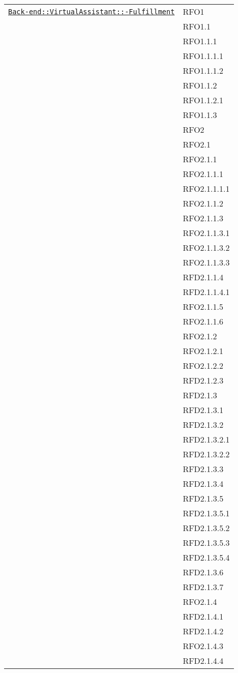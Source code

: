 \begin{longtable}{|>{\centering}m{10cm}|m{3cm}<{\centering}|}
\hyperref[Back-end::VirtualAssistant::Fulfillment]{\texttt{Back-end::VirtualAssistant::-\linebreak Fulfillment}} & RFO1\\
& RFO1.1\\
& RFO1.1.1\\
& RFO1.1.1.1\\
& RFO1.1.1.2\\
& RFO1.1.2\\
& RFO1.1.2.1\\
& RFO1.1.3\\
& RFO2\\
& RFO2.1\\
& RFO2.1.1\\
& RFO2.1.1.1\\
& RFO2.1.1.1.1\\
& RFO2.1.1.2\\
& RFO2.1.1.3\\
& RFO2.1.1.3.1\\
& RFO2.1.1.3.2\\
& RFO2.1.1.3.3\\
& RFD2.1.1.4\\
& RFD2.1.1.4.1\\
& RFO2.1.1.5\\
& RFO2.1.1.6\\
& RFO2.1.2\\
& RFO2.1.2.1\\
& RFO2.1.2.2\\
& RFD2.1.2.3\\
& RFD2.1.3\\
& RFD2.1.3.1\\
& RFD2.1.3.2\\
& RFD2.1.3.2.1\\
& RFD2.1.3.2.2\\
& RFD2.1.3.3\\
& RFD2.1.3.4\\
& RFD2.1.3.5\\
& RFD2.1.3.5.1\\
& RFD2.1.3.5.2\\
& RFD2.1.3.5.3\\
& RFD2.1.3.5.4\\
& RFD2.1.3.6\\
& RFD2.1.3.7\\
& RFO2.1.4\\
& RFD2.1.4.1\\
& RFD2.1.4.2\\
& RFO2.1.4.3\\
& RFD2.1.4.4\\

\end{longtable}

